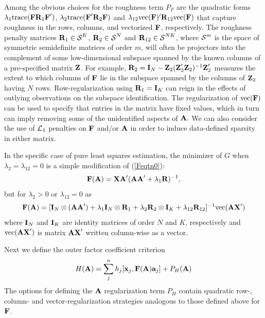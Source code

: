 \documentclass[12pt]{article}
\begin{document}
Among the obvious choices for the roughness term $P_F$ are the quadratic forms $\lambda_1 \mbox{trace}(\mbox{\bf F} \mbox{\bf R}_1 \mbox{\bf F}')$, $\lambda_2 \mbox{trace}(\mbox{\bf F}' \mbox{\bf R}_2 \mbox{\bf F})$ and $\lambda_{12} \mbox{vec}(\mbox{\bf F})' \mbox{\bf R}_{12}\mbox{vec}(\mbox{\bf F})$ that capture roughness in the rows, columns, and vectorized $\mbox{\bf F}$, respectively.  The roughness penalty matrices $\mbox{\bf R}_1 \in \mbox{$\cal S$}^K$, $\mbox{\bf R}_2 \in \mbox{$\cal S$}^N$ and $\mbox{\bf R}_{12} \in \mbox{$\cal S$}^{NK}$, where $\mbox{$\cal S$}^m$ is the space of symmetric semidefinite matrices of order $m$, will often be projectors into the complement of some low-dimensional subspace spanned by the known columns of  a pre-specified matrix $\mbox{\bf Z}$.  For example, $\mbox{\bf R}_2 = \mbox{\bf I}_N - \mbox{\bf Z}_2(\mbox{\bf Z}_2' \mbox{\bf Z}_2)^{-1}\mbox{\bf Z}_2'$ measures the extent to which columns of $\mbox{\bf F}$ lie in the subspace spanned by the columns of $\mbox{\bf Z}_2$ having $N$ rows.  Row-regularization using $\mbox{\bf R}_1 = \mbox{\bf I}_K$ can reign in the effects of outlying observations on the subspace identification.  The regularization of $\mbox{vec}(\mbox{\bf F})$ can be used to specify that entries in the matrix have fixed values, which in turn can imply removing some of the unidentified aspects of $\mbox{\bf A}.$  We can also consider the use of $\mbox{$\cal L$}_1$ penalties on $\mbox{\bf F}$ and/or $\mbox{\bf A}$ in order to induce data-defined sparsity in either matrix.

In the specific case of pure least squares estimation, the minimizer of $G$ when $\lambda_2 = \lambda_{12} = 0$ is a simple modification of (\ref{Feqtn0}):
\begin{equation} \label{Feqtn1}
  \mbox{\bf F}(\mbox{\bf A}) = \mbox{\bf X} \mbox{\bf A}'(\mbox{\bf A} \mbox{\bf A}' + \lambda_1 \mbox{\bf R})^{-1},
\end{equation}
but for $\lambda_2 > 0$ or $\lambda_{12} = 0$ as
\begin{equation} \label{Feqtn2}
  \mbox{\bf F}(\mbox{\bf A}) = [\mbox{\bf I}_N \otimes (\mbox{\bf A} \mbox{\bf A}') + \lambda_1 \mbox{\bf I}_N \otimes \mbox{\bf R}_1 + \lambda_2 \mbox{\bf R}_2 \otimes \mbox{\bf I}_K  + \lambda_{12} \mbox{\bf R}_{12}]^{-1} \mbox{vec}(\mbox{\bf A} \mbox{\bf X}')
\end{equation}
where $\mbox{\bf I}_N$ and $\mbox{\bf I}_K$ are identity matrices of order $N$ and $K$, respectively and $\mbox{vec}(\mbox{\bf A} \mbox{\bf X}')$ is matrix $\mbox{\bf A} \mbox{\bf X}'$ written column-wise as a vector.  

Next we define the outer factor coefficient criterion
\begin{equation} \label{Heqtn1}
  H(\mbox{\bf A}) = \sum_j^n h_j[\mbox{\bf x}_j, \mbox{\bf F}(\mbox{\bf A}) \mbox{\bf a}_j]  + P_H(\mbox{\bf A})
\end{equation}
The options for defining the $\mbox{\bf A}$ regularization term $P_H$ contain quadratic row-, column- and vector-regularization strategies analogous to those defined above for $\mbox{\bf F}$.  
\end{document}
